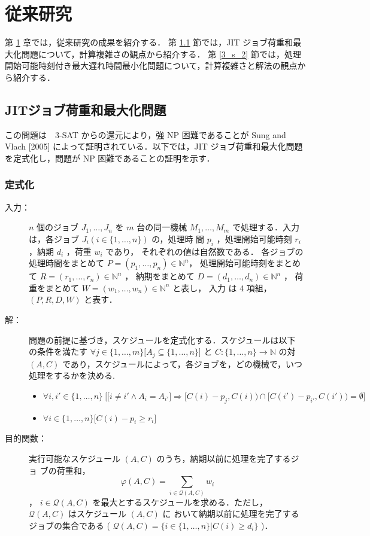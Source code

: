 \documentclass[12pt]{optlab-bachelor}
\begin{document}
\chapter{従来研究}\label{c_3}
第 \ref{c_3} 章では，従来研究の成果を紹介する．
第 \ref{3_s_1} 節では，JIT ジョブ荷重和最大化問題について，計算複雑さの観点から紹介する．
第 \ref{3_s_2} 節では，処理開始可能時刻付き最大遅れ時間最小化問題について，計算複雑さと解法の観点から紹介する．

\section{JITジョブ荷重和最大化問題}\label{3_s_1}
この問題は　\textsc{3-SAT} からの還元により，強 NP 困難であることが Sung and Vlach [2005] \cite{JIT} によって証明されている．以下では，JIT ジョブ荷重和最大化問題を定式化し，問題が NP 困難であることの証明を示す．
\subsection{定式化}
\begin{description}
  \item[入力：] $n$ 個のジョブ $J_1,\ldots,J_n$ を $m$ 台の同一機械 $M_1,\ldots,M_m$
  で処理する．入力は，各ジョブ $J_i ( i \in \{1,\ldots,n\} )$ の，処理時
  間 $p_i$ ，処理開始可能時刻 $r_i$ ，納期 $d_i$ ，荷重 $w_i$ であり，
  それぞれの値は自然数である．
  各ジョブの処理時間をまとめて $P = (p_1,\ldots,p_n) \in \mathbb{N}^n$，
  処理開始可能時刻をまとめて $R = (r_1,\ldots,r_n) \in \mathbb{N}^n$ ，
  納期をまとめて $D = (d_1,\ldots,d_n) \in \mathbb{N}^n$ ，
  荷重をまとめて $W = (w_1,\ldots,w_n) \in \mathbb{N}^n$ と表し，
  入力 は 4 項組，$(P,R,D,W)$ と表す．
  \item[解：] 問題の前提に基づき，スケジュールを定式化する．スケジュールは以下
  の条件を満たす $\forall j \in \{1,\ldots,m\}\big[A_j \subseteq
  \{1,\ldots,n\}\big]$ と $C : \{1,\ldots,n\} \to \mathbb{N}$ の対 $(A,
  C)$ であり，スケジュールによって，各ジョブを，どの機械で，いつ処理をするかを決める.
  \begin{itemize}
    \item {\small $\forall i, i' \in \{1,\ldots,n\}\ \Big[ \big[i \neq i' \land A_i = A_{i'}\big] \Rightarrow [C(i) - p_j, C(i)) \cap [C(i') - p_{i'}, C(i')) = \emptyset \Big]$}
    \item  $\forall i \in \{1,\ldots,n\}\big[C(i) - p_i \ge r_i\big]$
  \end{itemize}
  \item[目的関数：] 実行可能なスケジュール $(A, C)$ のうち，納期以前に処理を完了するジョ
  ブの荷重和，
  $$\displaystyle \varphi(A,C) = \sum_{i \in \mathcal{Q}(A,C)}w_i$$，
  $i \in \mathcal{Q}(A,C)$ を最大とするスケジュールを求める．ただし，
  $\mathcal{Q}(A, C)$ はスケジュール $(A, C)$ に
  おいて納期以前に処理を完了するジョブの集合である (
  $\mathcal{Q}(A, C) = \{i \in \{1,\ldots, n\} | C(i) \ge d_i \}$ )．
\end{description}
\end{document}
